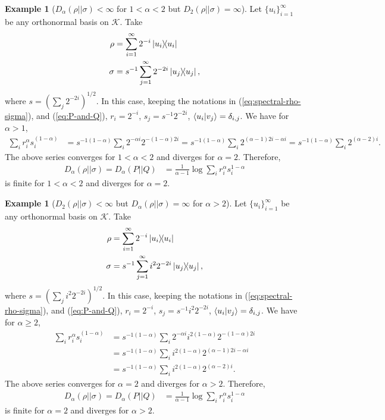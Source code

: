 \documentclass[12pt,a4paper,oneside]{article}
\numberwithin{equation}{section}
\theoremstyle{definition}  %
\newtheorem{eg}[defn]{Example}
\theoremstyle{plain}  %
\theoremstyle{remark} %
\newcommand{\CK}{\mathcal{K}}
\begin{document}
\begin{eg}[$D_{\alpha}(\rho||\sigma)<\infty$ for $1<\alpha< 2$ but $D_{2}(\rho||\sigma) = \infty$] Let $\{u_i\}_{i=1}^{\infty}$ be any orthonormal basis on $\CK $. Take \begin{align*}
    \rho &= \sum_{i=1}^{\infty}2^{-i}\ketbra{u_i}\\
    \sigma & =s^{-1} \sum_{j=1}^{\infty}2^{-2i}\ketbra{u_j},
\end{align*}
 where $s=\left(\sum_j 2^{-2i}\right)^{1/2}$. In this case, keeping the notations in (\ref{eq:spectral-rho-sigma}), and  (\ref{eq:P-and-Q}), $r_i=2^{-i}$, $s_j=s^{-1}2^{-2i}$, $\braket{u_i}{v_j}= \delta_{i,j}$. We have
for $\alpha>1$, \begin{align*}
     \sum_{i}r_i^{\alpha}s_i^{(1-\alpha)} &=s^{-1(1-\alpha)} \sum_{i}2^{-\alpha i}2^{-(1-\alpha)2i} = s^{-1(1-\alpha)}\sum_{i}2^{(\alpha-1)2i-\alpha i}= s^{-1(1-\alpha)}\sum_{i}2^{(\alpha-2)i}.
 \end{align*}
 The above series converges for $1<\alpha<2$ and diverges for $\alpha=2$. Therefore,
 \begin{align*}
     D_{\alpha}(\rho||\sigma) = D_{\alpha}(P||Q)&= \frac{1}{\alpha-1} \log \sum_{i}r_i^{\alpha}s_i^{1-\alpha}
 \end{align*}
is finite for $1<\alpha<2$ and diverges for $\alpha=2$. 
\end{eg}
\begin{eg}[$D_{2}(\rho||\sigma)<\infty$  but $D_{\alpha}(\rho||\sigma) = \infty$ for $\alpha>2$] Let $\{u_i\}_{i=1}^{\infty}$ be any orthonormal basis on $\CK $. Take \begin{align*}
    \rho &= \sum_{i=1}^{\infty}2^{-i}\ketbra{u_i}\\
    \sigma & =s^{-1} \sum_{j=1}^{\infty}i^{2}2^{-2i}\ketbra{u_j},
\end{align*}
 where $s=\left(\sum_j i^{2}2^{-2i}\right)^{1/2}$. In this case, keeping the notations in (\ref{eq:spectral-rho-sigma}), and  (\ref{eq:P-and-Q}), $r_i=2^{-i}$, $s_j=s^{-1}i^{2}2^{-2i}$, $\braket{u_i}{v_j}= \delta_{i,j}$. We have
for $\alpha\geq 2$, \begin{align*}
     \sum_{i}r_i^{\alpha}s_i^{(1-\alpha)} &=s^{-1(1-\alpha)} \sum_{i}2^{-\alpha i}i^{2(1-\alpha)}2^{-(1-\alpha)2i}\\ 
     &= s^{-1(1-\alpha)}\sum_{i}i^{2(1-\alpha)}2^{(\alpha-1)2i-\alpha i}\\
     &= s^{-1(1-\alpha)}\sum_{i}i^{2(1-\alpha)}2^{(\alpha-2)i}.
 \end{align*}
 The above series converges for $\alpha=2$ and diverges for $\alpha>2$. Therefore,
 \begin{align*}
     D_{\alpha}(\rho||\sigma) = D_{\alpha}(P||Q)&= \frac{1}{\alpha-1} \log \sum_{i}r_i^{\alpha}s_i^{1-\alpha}
 \end{align*}
is finite for $\alpha=2$ and diverges for $\alpha>2$. 
\end{eg}
\end{document}
